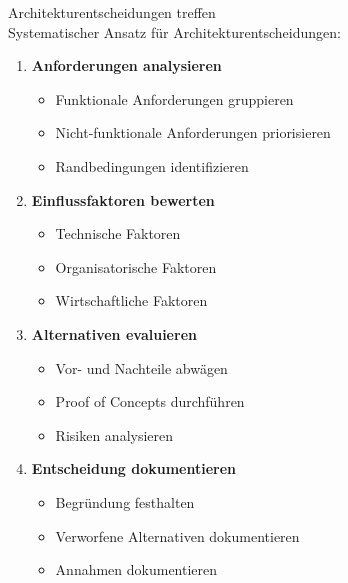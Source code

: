 \begin{KR}{Architekturentscheidungen treffen}\\
Systematischer Ansatz für Architekturentscheidungen:
\begin{enumerate}
    \item \textbf{Anforderungen analysieren}
    \begin{itemize}
        \item Funktionale Anforderungen gruppieren
        \item Nicht-funktionale Anforderungen priorisieren
        \item Randbedingungen identifizieren
    \end{itemize}
    
    \item \textbf{Einflussfaktoren bewerten}
    \begin{itemize}
        \item Technische Faktoren
        \item Organisatorische Faktoren
        \item Wirtschaftliche Faktoren
    \end{itemize}
    
    \item \textbf{Alternativen evaluieren}
    \begin{itemize}
        \item Vor- und Nachteile abwägen
        \item Proof of Concepts durchführen
        \item Risiken analysieren
    \end{itemize}
    
    \item \textbf{Entscheidung dokumentieren}
    \begin{itemize}
        \item Begründung festhalten
        \item Verworfene Alternativen dokumentieren
        \item Annahmen dokumentieren
    \end{itemize}
\end{enumerate}
\end{KR}

